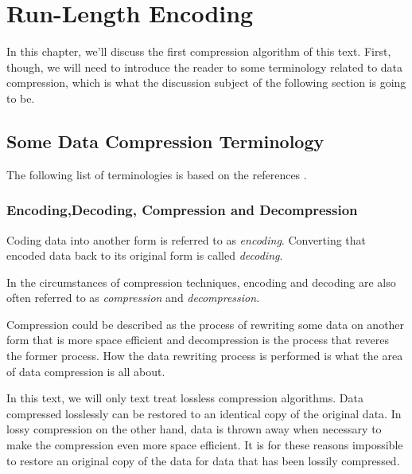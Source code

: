 \begin{comment}
  
\end{comment}

\chapter{Run-Length Encoding}
\label{cha:rle}

In this chapter, we'll discuss the first compression algorithm of this
text. First, though, we will need to introduce the reader to some
terminology related to data compression, which is what the discussion
subject of the following section is going to be.

\section{Some Data Compression Terminology}

The following list of terminologies is based on the references
\cite{Salomon:2004:DCC,mark1996data_compression_book,Bell:1989:MTC:76894.76896}.

\subsection{Encoding,Decoding, Compression and Decompression}

Coding data into another form is referred to as
\textit{encoding}. Converting that encoded data back
to its original form is called \textit{decoding}.

In the circumstances of compression techniques, encoding and decoding
are also often referred to as \textit{compression}
and \textit{decompression}.

Compression could be described as the process of rewriting some data
on another form that is more space efficient and decompression is the
process that reveres the former process. How the data rewriting
process is performed is what the area of data compression is all
about.

In this text, we will only text treat lossless compression
algorithms. Data compressed losslessly can be restored to an identical
copy of the original data. In lossy compression on the other hand,
data is thrown away when necessary to make the compression even more
space efficient. It is for these reasons impossible to restore an
original copy of the data for data that has been lossily compressed.

